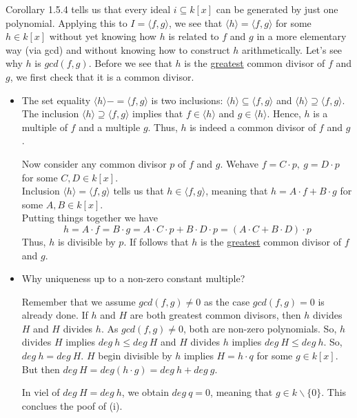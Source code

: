 \begin{proposition}[title = Proposition 1.5.7]
    Corollary 1.5.4 tells us that every ideal $i \subseteq k[x]$ can be generated by just one polynomial. Applying this to $I = \langle f,g \rangle$, we see that $\langle h \rangle = \langle f,g \rangle$ 
    for some $h \in k[x]$ without yet knowing how $h$ is related to $f$ and $g$ in a more elementary way (via gcd) and without knowing how to construct $h$ arithmetically. 
    Let's see why $h$ is $gcd(f,g)$. Before we see that $h$ is the \underline{greatest} common divisor of $f$ and $g$, we first check that it is a common divisor.  \\

    \begin{itemize}
      \item[(ii)] The set equality $\langle h \rangle -= \langle f,g \rangle$ is two inclusions: $\langle h \rangle \subseteq \langle f,g \rangle$ and $\langle h \rangle \supseteq \langle f,g \rangle$. \\[0.3em]
      The inclusion $\langle h \rangle \supseteq \langle f,g \rangle$ implies that $f \in \langle h \rangle$ and $g \in \langle h \rangle$. Hence, $h$ is a multiple of $f$ and 
      a multiple $g$. Thus, $h$ is indeed a common divisor of $f$ and $g$. 
      
      Now consider any common divisor $p$ of $f$ and $g$. Wehave $f = C \cdot p, \ g = D \cdot p$ for some $C,D \in k[x]$. \\[0.3em] 
      Inclusion $\langle h \rangle = \langle f, g \rangle$ tells us that $h \in \langle f,g \rangle$, meaning that $h = A \cdot f + B \cdot g$ for some $A,B \in k[x]$. \\[0.3em]  
      Putting things together we have \[h = A \cdot f = B \cdot g = A \cdot C \cdot p + B \cdot D \cdot p = (A \cdot C + B \cdot D) \cdot p\] 
      Thus, $h$ is divisible by $p$. If follows that $h$ is the \underline{greatest} common divisor of $f$ and $g$. 

      \item[(i)] Why uniqueness up to a non-zero constant multiple? 
      
      Remember that we assume $gcd(f,g) \neq 0$ as the case $gcd(f,g) = 0$ is already done. If $h$ and $H$ are both greatest common divisors, then $h$ divides $H$ and $H$ divides $h$. 
      As $gcd(f,g) \neq 0$, both are non-zero polynomials. So, $h$ divides $H$ implies $deg \ h \leq deg \ H$ and $H$ divides $h$ implies $deg \ H \leq deg \ h$. So, $deg \ h  = deg \ H$. 
      $H$ begin divisible by $h$ implies $H = h \cdot q$ for some $g \in k[x]$. But then $deg \ H = deg(h \cdot g) = deg \ h + deg \ g$. 

      In viel of $deg \ H = deg \ h$, we obtain $deg \ q =0$, meaning that $g \in k \backslash\{0\}$. This conclues the poof of (i). 
    \end{itemize}
  \end{proposition}

